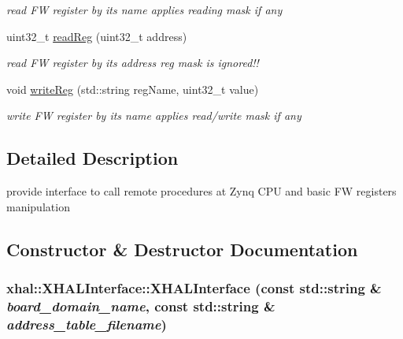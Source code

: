 \begin{DoxyCompactItemize}
\begin{DoxyCompactList}\small\item\em read FW register by its name applies reading mask if any \item\end{DoxyCompactList}\item 
\hypertarget{classxhal_1_1XHALInterface_a1e3b29169f1bc6c13e469cd186fc662f}{
uint32\_\-t \hyperlink{classxhal_1_1XHALInterface_a1e3b29169f1bc6c13e469cd186fc662f}{readReg} (uint32\_\-t address)}
\label{classxhal_1_1XHALInterface_a1e3b29169f1bc6c13e469cd186fc662f}

\begin{DoxyCompactList}\small\item\em read FW register by its address reg mask is ignored!! \item\end{DoxyCompactList}\item 
\hypertarget{classxhal_1_1XHALInterface_a3dfb7ba89c239806529c9f1415f5b8bd}{
void \hyperlink{classxhal_1_1XHALInterface_a3dfb7ba89c239806529c9f1415f5b8bd}{writeReg} (std::string regName, uint32\_\-t value)}
\label{classxhal_1_1XHALInterface_a3dfb7ba89c239806529c9f1415f5b8bd}

\begin{DoxyCompactList}\small\item\em write FW register by its name applies read/write mask if any \item\end{DoxyCompactList}\end{DoxyCompactItemize}


\subsection{Detailed Description}
provide interface to call remote procedures at Zynq CPU and basic FW registers manipulation 

\subsection{Constructor \& Destructor Documentation}
\hypertarget{classxhal_1_1XHALInterface_ac44129acadc38854d639e1dfa6fd6d92}{
\subsubsection[{XHALInterface}]{\setlength{\rightskip}{0pt plus 5cm}xhal::XHALInterface::XHALInterface (const std::string \& {\em board\_\-domain\_\-name}, \/  const std::string \& {\em address\_\-table\_\-filename})}}
\label{classxhal_1_1XHALInterface_ac44129acadc38854d639e1dfa6fd6d92}


